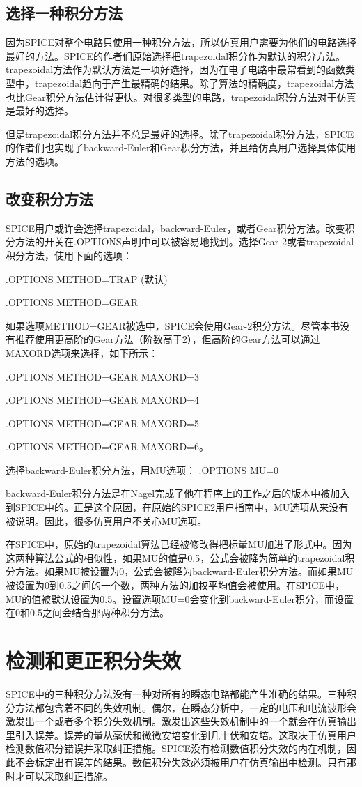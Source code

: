\subsection{选择一种积分方法}
因为SPICE对整个电路只使用一种积分方法，所以仿真用户需要为他们的电路选择最好的方法。SPICE的作者们原始选择把trapezoidal积分作为默认的积分方法。trapezoidal方法作为默认方法是一项好选择，因为在电子电路中最常看到的函数类型中，trapezoidal趋向于产生最精确的结果。除了算法的精确度，trapezoidal方法也比Gear积分方法估计得更快。对很多类型的电路，trapezoidal积分方法对于仿真是最好的选择。

但是trapezoidal积分方法并不总是最好的选择。除了trapezoidal积分方法，SPICE的作者们也实现了backward-Euler和Gear积分方法，并且给仿真用户选择具体使用方法的选项。

\subsection{改变积分方法}
SPICE用户或许会选择trapezoidal，backward-Euler，或者Gear积分方法。改变积分方法的开关在.OPTIONS声明中可以被容易地找到。选择Gear-2或者trapezoidal积分方法，使用下面的选项：

.OPTIONS METHOD=TRAP (默认)

.OPTIONS METHOD=GEAR

如果选项METHOD=GEAR被选中，SPICE会使用Gear-2积分方法。尽管本书没有推荐使用更高阶的Gear方法（阶数高于2），但高阶的Gear方法可以通过MAXORD选项来选择，如下所示：

.OPTIONS METHOD=GEAR MAXORD=3

.OPTIONS METHOD=GEAR MAXORD=4

.OPTIONS METHOD=GEAR MAXORD=5

.OPTIONS METHOD=GEAR MAXORD=6。

选择backward-Euler积分方法，用MU选项：
.OPTIONS MU=0

backward-Euler积分方法是在Nagel\cite{Nagel}完成了他在程序上的工作之后的版本中被加入到SPICE中的。正是这个原因，在原始的SPICE2用户指南\cite{SPICE2G.6}中，MU选项从来没有被说明。因此，很多仿真用户不关心MU选项。

在SPICE中，原始的trapezoidal算法已经被修改得把标量MU加进了形式中。因为这两种算法公式的相似性，如果MU的值是0.5，公式会被降为简单的trapezoidal积分方法。如果MU被设置为0，公式会被降为backward-Euler积分方法。而如果MU被设置为0到0.5之间的一个数，两种方法的加权平均值会被使用。在SPICE中，MU的值被默认设置为0.5。设置选项MU=0会变化到backward-Euler积分，而设置在0和0.5之间会结合那两种积分方法。

\section{检测和更正积分失效}
SPICE中的三种积分方法没有一种对所有的瞬态电路都能产生准确的结果。三种积分方法都包含着不同的失效机制。偶尔，在瞬态分析中，一定的电压和电流波形会激发出一个或者多个积分失效机制。激发出这些失效机制中的一个就会在仿真输出里引入误差。误差的量从毫伏和微微安培变化到几十伏和安培。这取决于仿真用户检测数值积分错误并采取纠正措施。SPICE没有检测数值积分失效的内在机制，因此不会标定出有误差的结果。数值积分失效必须被用户在仿真输出中检测。只有那时才可以采取纠正措施。

